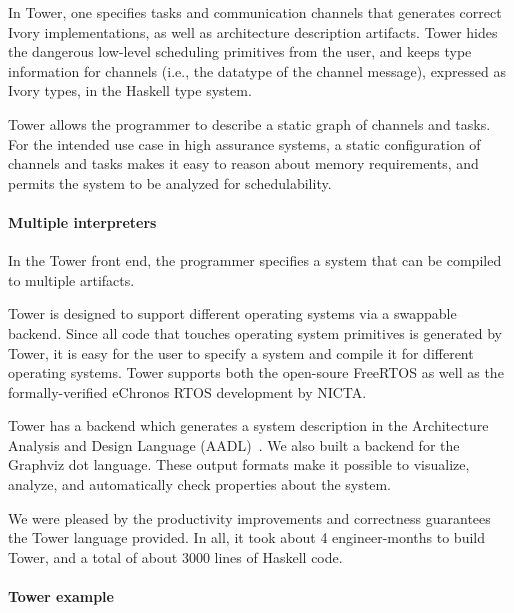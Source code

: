 In Tower, one specifies tasks and communication channels that generates correct
Ivory implementations, as well as architecture description artifacts. Tower
hides the dangerous low-level scheduling primitives from the user, and keeps
type information for channels (i.e., the datatype of the channel message),
expressed as Ivory types, in the Haskell type system.

Tower allows the programmer to describe a static graph of channels and tasks.
For the intended use case in high assurance systems, a static configuration of
channels and tasks makes it easy to reason about memory requirements, and
permits the system to be analyzed for schedulability.

\paragraph{Multiple interpreters}

In the Tower front end, the programmer specifies a system that can be compiled
to multiple artifacts.

Tower is designed to support different operating systems via a swappable
backend. Since all code that touches operating system primitives is generated by
Tower, it is easy for the user to specify a system and compile it for
different operating systems. Tower supports both the open-soure
FreeRTOS\cite{freertos} as well as the formally-verified
eChronos RTOS\cite{echronos} development by NICTA.

Tower has a backend which generates a system description in the Architecture
Analysis and Design Language (AADL)~\cite{SAE:AADL}. We also built a backend for
the Graphviz dot language.  These output formats make it possible to visualize,
analyze, and automatically check properties about the system.

We were pleased by the productivity improvements and correctness guarantees the
Tower language provided. In all, it took about 4 engineer-months to build Tower,
and a total of about 3000 lines of Haskell code.


\paragraph{Tower example}
\label{sec:examples}


